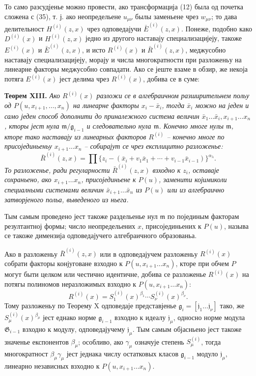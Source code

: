 \documentclass[11pt]{article}
\providecommand{\Gmod}{\mathfrak G}
\providecommand{\mideal}{\mathfrak m}
\providecommand{\gideal}{\mathfrak g}
\providecommand{\jideal}{\mathfrak j}
\begin{document}
То само разсудјенье можно провести, ако трансформација (12) была од почетка сложена с (35), т. ј. ако неопредельене $u_{\mu\nu}$ былы заменьене чрез $w_{\mu\nu}$; то дава делительност $H^{(i)}(z,x)$ чрез одповедајучи $\bar E^{(i)}(z,x)$. Понеже, подобно како $D^{(i)}(x)$ и $H^{(i)}(z,x)$ једно из другого наставају специализацијеју, такоже $E^{(i)}(x)$ и $\bar E^{(i)}(z,x)$, и исто $R^{(i)}(x)$ и $\bar R^{(i)}(z,x)$, меджусобно наставају специализацијеју, морају и числа многократности при разложеньу на линеарне факторы меджусобно совпадати. Ако се јеште взаме в обзир, же некоја потяга $E^{(i)}(x)$ јест делима чрез $R^{(i)}(x)$, добива се в суме:

\medskip
\noindent\textbf{Теорем XIII.} {\itshape Ако $R^{(i)}(x)$ разложи се в алгебраичном разширительнем польу од $P(u,x_{i+1},\ldots,x_n)$ на линеарне факторы $x_i-\bar x_i$, тогда $\bar x_i$ можно на једен и само једен способ дополнити до приналежного система величин $\bar x_1\ldots\bar x_i,x_{i+1}\ldots x_n$, кторы јест нула $\mideal/\gideal_{i-1}$ и следовательно нула $\mideal$. Конечно многе нулы $\mideal$, кторе тако наставају из линеарных факторов $R^{(i)}$ -- конечно многе по присојединьеньу $x_{i+1}\ldots x_n$ -- собирајут се чрез експлицитно разложенье:}
\begin{equation}
 \bar R^{(i)}(z,x)=\prod\{z_i-(\bar x_i+v_1\bar x_1+\cdots+v_{i-1}\bar x_{i-1})\}^{\alpha_\lambda}.
\tag{36}
\end{equation}
{\itshape То разложенье, ради регуларности $\bar R^{(i)}(z,x)$ взходно к $z_i$, оставаје сохраньено, ако $x_{i+1}\ldots x_n$, присојединьене к $P(u)$, заменити којимиколи специалными системами величин $\bar x_{i+1}\ldots\bar x_n$ из $P(u)$ или из алгебраично затворјеного польа, выведеного из ньега.}

Тым самым проведено јест такоже раздельенье нул $\mideal$ по појединым факторам резултантној формы; число неопредельених $x$, присојединьених к $P(u)$, называ се такоже димензија одповедајучего алгебраичного образованьа.

Ако в разложеньу $\bar R^{(i)}(z,x)$ или в одповедајучем разложеньу $R^{(i)}(x)$ собрати факторы конјуговане взходно к $P(u,x_{i+1}\ldots x_n)$, кторе при обчем $P$ могут быти целком или честично идентичне, добива се разложенье $R^{(i)}(x)$ на потягы полиномов неразложимых взходно к $P(u,x_{i+1}\ldots x_n)$:
\[
 R^{(i)}(x)=S^{(i)}_1(x)^{\beta_1}\cdots S^{(i)}_\nu(x)^{\beta_\nu}.
\]
Тому разложеньу по Теорему X одповедаје представјенье $\gideal_i=[\jideal_1\ldots\jideal_\nu]$ тако, же $S^{(i)}_\mu(x)^{\beta_\mu}$ јест еднако норме $\gideal_{i-1}$ взходно к идеалу $\jideal_\mu$, односно норме модула $\Gmod_{i-1}$ взходно к модулу, одповедајучему $\jideal_\mu$. Тым самым објасньено јест такоже значенье експонентов $\beta_\mu$; особливо, ако $\gamma_\mu$ означује степень $S^{(i)}_\mu$, тогда многократност $\beta_\mu\gamma_\mu$ јест једнака числу остатковых класов $\gideal_{i-1}$ модуло $\jideal_\mu$, линеарно независных взходно к $P(u,x_{i+1}\ldots x_n)$.
\end{document}
